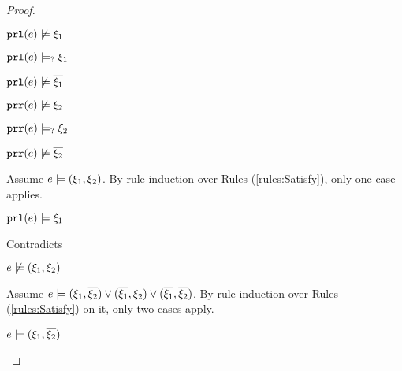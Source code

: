 \begin{proof}
\begin{byCases}
\begin{byCases}
\begin{byCases}
            \begin{pfsteps*}
            \item $\mathtt{prl}(e) \not\models \xi_1$  
            \item $\mathtt{prl}(e) \models_{?} \xi_1$  
            \item $\mathtt{prl}(e) \not\models \overline{\xi_1}$  
            \item $\mathtt{prr}(e) \not\models \xi_2$  
            \item $\mathtt{prr}(e) \models_{?} \xi_2$  
            \item $\mathtt{prr}(e) \not\models \overline{\xi_2}$  
            \end{pfsteps*}
            Assume $e \models (\xi_1 , \xi_2)$. By rule induction over Rules (\ref{rules:Satisfy}), only one case applies.
            \begin{byCases}
            \item[\text{(\ref{rule:CSNotValPair})}]
                \begin{pfsteps*}
                \item $\mathtt{prl}(e) \models \xi_1$ 
                \end{pfsteps*}
                Contradicts 
            \end{byCases}
            \begin{pfsteps*}
            \item $e \not\models (\xi_1 , \xi_2)$  
            \end{pfsteps*}
            Assume $e \models (\xi_1 , \overline{\xi_2}) \vee (\overline{\xi_1} , \xi_2) \vee (\overline{\xi_1} , \overline{\xi_2})$. By rule induction over Rules (\ref{rules:Satisfy}) on it, only two cases apply.
            \begin{byCases}
            \item[\text{(\ref{rule:CSOr1})}]
                \begin{pfsteps*}
                \item $e \models (\xi_1 , \overline{\xi_2})$  
                \end{pfsteps*}

\end{byCases}
\end{byCases}
\end{byCases}
\end{byCases}
\end{proof}
